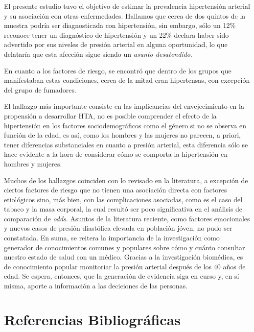 \documentclass{aa}
\begin{document}
El presente estudio tuvo el objetivo de estimar la prevalencia hipertensión arterial y su asociación con otras enfermedades. Hallamos que cerca de dos quintos de la muestra podría ser diagnosticada con hipertensión, sin embargo, sólo un 12\% reconoce tener un diagnóstico de hipertensión y un 22\% declara haber sido advertido por sus niveles de presión arterial en alguna oportunidad, lo que delataría que esta afección sigue siendo un \textit{asunto desatendido}. 

En cuanto a los factores de riesgo, se encontró que dentro de los grupos que manifestaban estas condiciones, cerca de la mitad eran hipertensas, con excepción del grupo de fumadores. 

El hallazgo más importante consiste en las implicancias del envejecimiento en la propensión a desarrollar HTA, no es posible comprender el efecto de la hipertensión en los factores sociodemográficos como el género si no se observa en función de la edad, es así, como los hombres y las mujeres no parecen, a priori, tener diferencias substanciales en cuanto a presión arterial, esta diferencia sólo se hace evidente a la hora de considerar cómo se comporta la hipertensión en hombres y mujeres.

Muchos de los hallazgos coinciden con lo revisado en la literatura, a excepción de ciertos factores de riesgo que no tienen una asociación directa con factores etiológicos sino, más bien, con las complicaciones asociadas, como es el caso del tabaco y la masa corporal, la cual resultó ser poco significativa en el análisis de comparación de \textit{odds}. Asuntos de la literatura reciente, como factores emocionales y nuevos casos de presión diastólica elevada en población jóven, no pudo ser constatada. En suma, se reitera la importancia de la investigación como generador de conocimientos comunes y populares sobre cómo y cuánto consultar nuestro estado de salud con un médico. Gracias a la investigación biomédica, es de conocimiento popular monitoriar la presión arterial después de los 40 años de edad. Se espera, entonces, que la generación de evidencia siga en curso y, en sí misma, aporte a información a las deciciones de las personas.




\section{Referencias Bibliográficas}
\end{document}
